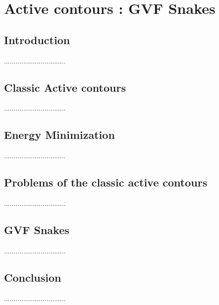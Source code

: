 \pagestyle{fancy}
\chapter{Active contours : GVF Snakes}\label{ch:active-contours-:-gvf-snakes}
\chead{}
\lhead{\bfseries \chaptername {\,} \thechapter }
\cfoot{\bfseries \thepage}
\rhead{}

\section{Introduction}\label{sec:introduction-ch2}
        ................................

\section{Classic Active contours}\label{sec:classic-active-contours}
        ................................


\section{Energy Minimization}\label{sec:energy-minimization}
        ................................


\section{Problems of the classic active contours}\label{sec:problems-of-the-classic-active-contours}
        ................................


\section{GVF Snakes}\label{sec:gvf-snakes}
        ................................


\section{Conclusion}\label{sec:conclusion-ch2}
        ................................
